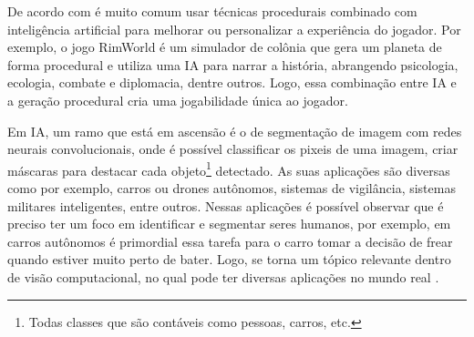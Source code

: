 


De acordo com  é muito comum usar técnicas procedurais combinado com inteligência artificial para melhorar ou personalizar a experiência do jogador. Por exemplo, o jogo RimWorld é um simulador de colônia que gera um planeta de forma procedural e utiliza uma IA para narrar a história, abrangendo psicologia, ecologia, combate e diplomacia, dentre outros. Logo, essa combinação entre IA e a geração procedural cria uma jogabilidade única ao jogador.


Em IA, um ramo que está em ascensão é o de segmentação de imagem com redes neurais convolucionais, onde é possível classificar os pixeis de uma imagem, criar máscaras  para destacar cada objeto\footnote{Todas classes que são contáveis como pessoas, carros, etc.} detectado. As suas aplicações são diversas como por exemplo, carros ou drones autônomos, sistemas de vigilância, sistemas militares inteligentes, entre outros. Nessas aplicações é possível observar que é preciso ter um foco em identificar e segmentar seres humanos, por exemplo, em carros autônomos é primordial essa tarefa para o carro tomar a decisão de frear quando estiver muito perto de bater. Logo, se torna um tópico relevante dentro de visão computacional, no qual pode ter diversas aplicações no mundo real \cite{kirillov2019panoptic, dp_semantic_segmantation}.

